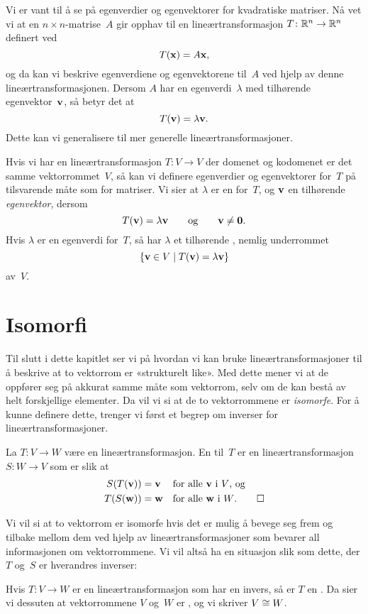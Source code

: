 Vi er vant til å se på egenverdier og egenvektorer for kvadratiske
matriser.  Nå vet vi at en $n \times n$-matrise~$A$ gir opphav til en
lineærtransformasjon $T \colon \mathbb{R}^n \to \mathbb{R}^n$ definert ved
\[
T(\mathbf{x}) = A\mathbf{x},
\]
og da kan vi beskrive egenverdiene og egenvektorene til~$A$ ved hjelp
av denne lineærtransformasjonen.  Dersom $A$ har en
egenverdi~$\lambda$ med tilhørende egenvektor~$\mathbf{v}$, så betyr det at
\[
T(\mathbf{v}) = \lambda \mathbf{v}.
\]
Dette kan vi generalisere til mer generelle lineærtransformasjoner.

Hvis vi har en lineærtransformasjon $T \colon V \to V$ der domenet og
kodomenet er det samme vektorrommet~$V$, så kan vi definere
egenverdier og egenvektorer for~$T$ på tilsvarende måte som for
matriser.  Vi sier at $\lambda$ er en  for~$T$, og
$\mathbf{v}$ en tilhørende \emph{egenvektor}, dersom
\[
T(\mathbf{v}) = \lambda \mathbf{v}
\qquad\text{og}\qquad
\mathbf{v} \ne \mathbf{0}.
\]
Hvis $\lambda$ er en egenverdi for~$T$, så har $\lambda$ et tilhørende
, nemlig underrommet
\[
\{ \mathbf{v} \in V \mid T(\mathbf{v}) = \lambda \mathbf{v} \}
\]
av~$V$.


\section*{Isomorfi}

Til slutt i dette kapitlet ser vi på hvordan vi kan bruke
lineærtransformasjoner til å beskrive at to vektorrom er «strukturelt
like».  Med dette mener vi at de oppfører seg på akkurat samme måte
som vektorrom, selv om de kan bestå av helt forskjellige elementer.
Da vil vi si at de to vektorrommene er \emph{isomorfe}.  For å kunne
definere dette, trenger vi først et begrep om inverser for
lineærtransformasjoner.

\begin{defn}
La $T \colon V \to W$ være en lineærtransformasjon.  En
 til~$T$ er en lineærtransformasjon $S \colon W \to V$
som er slik at
\begin{align*}
S(T(\mathbf{v})) &= \mathbf{v} &&\text{for alle $\mathbf{v}$ i~$V$, og} \\
T(S(\mathbf{w})) &= \mathbf{w} &&\text{for alle $\mathbf{w}$ i~$W$.}
\qedhere
\end{align*}
\end{defn}

Vi vil si at to vektorrom er isomorfe hvis det er mulig å bevege seg
frem og tilbake mellom dem ved hjelp av lineærtransformasjoner som
bevarer all informasjonen om vektorrommene.  Vi vil altså ha en
situasjon slik som dette, der $T$ og~$S$ er hverandres inverser:
\begin{center}
\end{center}
\begin{defn}
Hvis $T \colon V \to W$ er en lineærtransformasjon som har en invers,
så er $T$ en .  Da sier vi dessuten at vektorrommene
$V$ og~$W$ er , og vi skriver $V \cong W$.
\end{defn}

